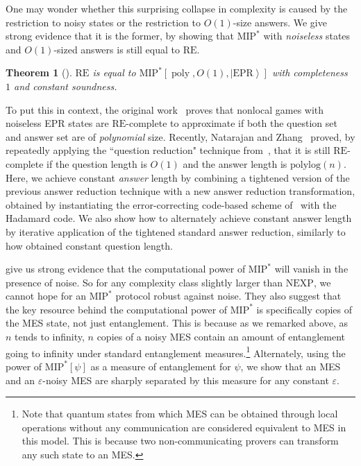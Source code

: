 \documentclass[10pt,a4paper]{article}
\theoremstyle{plain}
\newtheorem{theorem}{Theorem}[section]
\theoremstyle{definition}
\newcommand {\ket} [1] {\ensuremath{ \left| #1 \right\rangle }}
\newcommand{\poly} {\ensuremath{\operatorname{poly}}}
\newcommand{\1}{\mathbb{1}} %
\newcommand{\MIP}{\mathrm{MIP}}
\newcommand{\RE}{\mathrm{RE}}
\newcommand{\NEXP}{\mathrm{NEXP}}
\begin{document}
One may wonder whether this surprising collapse in complexity is caused by the restriction to noisy states or the restriction to $O(1)$-size answers. We give strong evidence that it is the former, by showing that $\MIP^*$ with \emph{noiseless} states and $O(1)$-sized answers is still equal to $\RE$.
\begin{theorem}[]
    \label{thm:informal2}
    $\RE$ is equal to $\MIP^\ast[\poly, O(1),\ket{\mathrm{EPR}}]$ with completeness $1$ and constant soundness.
\end{theorem}
To put this in context, the original work~\cite{JNVWYuen'20,JNVWY'20} proves that nonlocal games with noiseless EPR states are $\mathrm{RE}$-complete to approximate if both the question set and answer set are of \emph{polynomial} size. Recently, Natarajan and Zhang~\cite{10.1145/3564246.3585208} proved, by repeatedly applying the ``question reduction" technique from~\cite{JNVWY'20}, that it is still $\mathrm{RE}$-complete if the question length is $O(1)$ and the answer length is $\mathrm{polylog}(n)$. 
Here, we achieve constant \emph{answer} length by combining a tightened version of the previous answer reduction technique with a new answer reduction transformation, obtained by instantiating the error-correcting code-based scheme of~\cite{neexp} with the Hadamard code. We also show how to alternately achieve constant answer length by iterative application of the tightened standard answer reduction, similarly to how \cite{10.1145/3564246.3585208} obtained constant question length. 


 give us strong evidence that the computational power of $\MIP^*$ will vanish in the presence of noise. 
So for any complexity class slightly larger than $\NEXP$, we cannot hope for an $\MIP^*$ protocol robust against noise.
They also suggest that the key resource behind the computational power of $\MIP^*$ is specifically copies of the MES state, not just entanglement. This is because as we remarked above,
as $n$ tends to infinity, $n$ copies of a noisy MES contain an amount of entanglement going to infinity under standard entanglement measures.\footnote{Note that quantum states from which MES can be obtained through local operations without any communication are considered equivalent to MES in this model. This is because two non-communicating provers can transform any such state to an MES.}
Alternately, using the power of $\MIP^*[\psi]$ as a measure of entanglement for $\psi$, we show that an MES and an $\varepsilon$-noisy MES are sharply separated by this measure for any constant $\varepsilon$.
\end{document}
